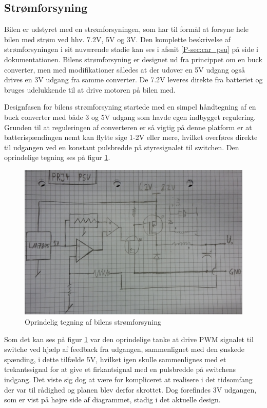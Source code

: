 \subsection{Strømforsyning}\label{sec:hwd_psu}

Bilen er udstyret med en strømforsyningen, som har til formål at forsyne hele bilen med strøm ved hhv. 7.2V, 5V og 3V. 
Den komplette beskrivelse af strømforsyningen i sit nuværende stadie kan ses i afsnit \ref{P-sec:car_psu}  på side \pageref{P-sec:car_psu} i dokumentationen.
Bilens strømforsyning er designet ud fra princippet om en buck converter\cite[s. 326] {lib:analogteknik}, men med modifikationer således at der udover en 5V udgang også drives en 3V udgang fra samme converter.
De 7.2V leveres direkte fra batteriet og bruges udelukkende til at drive motoren på bilen med.

Designfasen for bilens strømforsyning startede med en simpel håndtegning af en buck converter med både 3 og 5V udgang som havde egen indbygget regulering. 
Grunden til at reguleringen af converteren er så vigtig på denne platform er at batterispændingen nemt kan flytte sige 1-2V eller mere, hvilket overføres direkte til udgangen ved en konstant pulsbredde på styresignalet til switchen. Den oprindelige tegning ses på figur \ref{fig:bil_psu_sketch}.

\begin{figure}[h]
\centering
\includegraphics[width=\textwidth]{../fig/diagrammer/bil/psu_sketch}
\caption{Oprindelig tegning af bilens strømforsyning}
\label{fig:bil_psu_sketch}
\end{figure}

Som det kan ses på figur \ref{fig:bil_psu_sketch} var den oprindelige tanke at drive PWM signalet til switche ved hjælp af feedback fra udgangen, sammenlignet med den ønskede spænding, i dette tilfælde 5V, hvilket igen skulle sammenlignes med et trekantssignal for at give et firkantsignal med en pulsbredde på switchens indgang.
Det viste sig dog at være for kompliceret at realisere i det tidsomfang der var til rådighed og planen blev derfor skrottet.
Dog forefindes 3V udgangen, som er vist på højre side af diagrammet, stadig i det aktuelle design.

